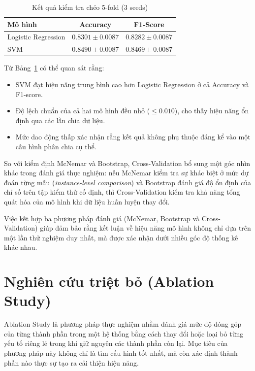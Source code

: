 \documentclass[12pt, a4paper]{report}
\newcommand{\cvLrAcc}{0.8301}
\newcommand{\cvLrAccStd}{0.0087}
\newcommand{\cvLrFone}{0.8282}
\newcommand{\cvLrFoneStd}{0.0087}
\newcommand{\cvSvmAcc}{0.8490}
\newcommand{\cvSvmAccStd}{0.0087}
\newcommand{\cvSvmFone}{0.8469}
\newcommand{\cvSvmFoneStd}{0.0087}
\begin{document}
\begin{table}[H]
\centering
\caption{Kết quả kiểm tra chéo 5-fold (3 seeds)}
\label{tab:cv}
\begin{tabular}{lcc}
\toprule
\textbf{Mô hình} & \textbf{Accuracy} & \textbf{F1-Score} \\
\midrule
Logistic Regression & $\cvLrAcc \pm \cvLrAccStd$ & $\cvLrFone \pm \cvLrFoneStd$ \\
SVM                 & $\cvSvmAcc \pm \cvSvmAccStd$ & $\cvSvmFone \pm \cvSvmFoneStd$ \\
\bottomrule
\end{tabular}
\end{table}

Từ Bảng~\ref{tab:cv} có thể quan sát rằng:

\begin{itemize}
    \item SVM đạt hiệu năng trung bình cao hơn Logistic Regression 
    ở cả Accuracy và F1-score.
    
    \item Độ lệch chuẩn của cả hai mô hình đều nhỏ ($\leq 0.010$), 
    cho thấy hiệu năng ổn định qua các lần chia dữ liệu.
    
    \item Mức dao động thấp xác nhận rằng kết quả không phụ thuộc 
    đáng kể vào một cấu hình phân chia cụ thể.
\end{itemize}

So với kiểm định McNemar và Bootstrap, Cross-Validation bổ sung 
một góc nhìn khác trong đánh giá thực nghiệm: nếu McNemar kiểm tra 
sự khác biệt ở mức dự đoán từng mẫu (\textit{instance-level comparison}) 
và Bootstrap đánh giá độ ổn định của chỉ số trên tập kiểm thử cố định, 
thì Cross-Validation kiểm tra khả năng tổng quát hóa của mô hình 
khi dữ liệu huấn luyện thay đổi.

Việc kết hợp ba phương pháp đánh giá (McNemar, Bootstrap và 
Cross-Validation) giúp đảm bảo rằng kết luận về hiệu năng mô hình 
không chỉ dựa trên một lần thử nghiệm duy nhất, mà được xác nhận 
dưới nhiều góc độ thống kê khác nhau.

\section{Nghiên cứu triệt bỏ (Ablation Study)}
\label{sec:ablation}
Ablation Study là phương pháp thực nghiệm nhằm đánh giá mức độ 
đóng góp của từng thành phần trong một hệ thống bằng cách thay đổi 
hoặc loại bỏ từng yếu tố riêng lẻ trong khi giữ nguyên các thành phần còn lại. 
Mục tiêu của phương pháp này không chỉ là tìm cấu hình tốt nhất, 
mà còn xác định thành phần nào thực sự tạo ra cải thiện hiệu năng.
\end{document}
